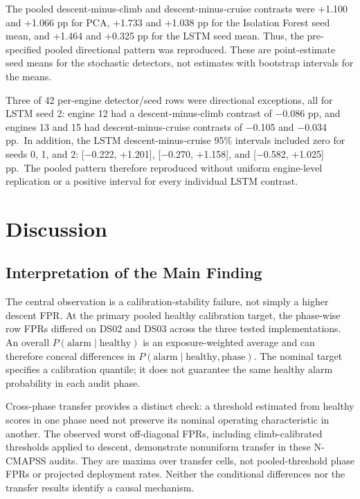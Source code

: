 \documentclass[10pt,conference]{IEEEtran}
\begin{document}
The pooled descent-minus-climb and descent-minus-cruise contrasts were +1.100 and +1.066 pp for PCA, +1.733 and +1.038 pp for the Isolation Forest seed mean, and +1.464 and +0.325 pp for the LSTM seed mean. Thus, the pre-specified pooled directional pattern was reproduced. These are point-estimate seed means for the stochastic detectors, not estimates with bootstrap intervals for the means.

Three of 42 per-engine detector/seed rows were directional exceptions, all for LSTM seed 2: engine 12 had a descent-minus-climb contrast of −0.086 pp, and engines 13 and 15 had descent-minus-cruise contrasts of −0.105 and −0.034 pp.~In addition, the LSTM descent-minus-cruise 95\% intervals included zero for seeds 0, 1, and 2: {[}−0.222, +1.201{]}, {[}−0.270, +1.158{]}, and {[}−0.582, +1.025{]} pp.~The pooled pattern therefore reproduced without uniform engine-level replication or a positive interval for every individual LSTM contrast.

\section{Discussion}\label{discussion}

\subsection{Interpretation of the Main Finding}\label{interpretation-of-the-main-finding}

The central observation is a calibration-stability failure, not simply a higher descent FPR. At the primary pooled healthy calibration target, the phase-wise row FPRs differed on DS02 and DS03 across the three tested implementations. An overall \(P(\mathrm{alarm}\mid\mathrm{healthy})\) is an exposure-weighted average and can therefore conceal differences in \(P(\mathrm{alarm}\mid\mathrm{healthy},\mathrm{phase})\). The nominal target specifies a calibration quantile; it does not guarantee the same healthy alarm probability in each audit phase.

Cross-phase transfer provides a distinct check: a threshold estimated from healthy scores in one phase need not preserve its nominal operating characteristic in another. The observed worst off-diagonal FPRs, including climb-calibrated thresholds applied to descent, demonstrate nonuniform transfer in these N-CMAPSS audits. They are maxima over transfer cells, not pooled-threshold phase FPRs or projected deployment rates. Neither the conditional differences nor the transfer results identify a causal mechanism.
\end{document}
